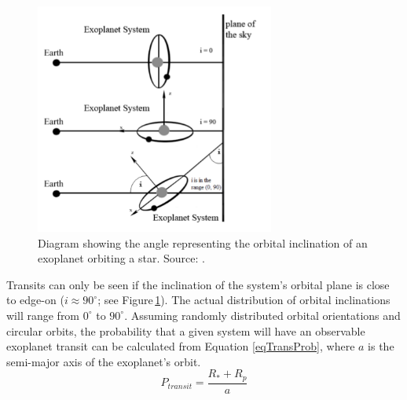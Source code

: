 \begin{figure}
\centering
\includegraphics[width=0.7\textwidth]{OrbitalPlane.png}
\caption{Diagram showing the angle representing the orbital inclination of an exoplanet orbiting a star. Source: \citet{1998Zeilik}.}
\label{figOrbit}
\end{figure}

Transits can only be seen if the inclination of the system's orbital plane is close to edge-on ($i \approx 90^\circ$; see Figure\,\ref{figOrbit}). The actual distribution of orbital inclinations will range from $0^\circ$ to $90^\circ$. Assuming randomly distributed orbital orientations and circular orbits, the probability that a given system will have an observable exoplanet transit can be calculated from Equation \ref{eqTransProb}, where $a$ is the semi-major axis of the exoplanet's orbit.\\

\begin{equation}
P_{transit} = \frac{R_\ast + R_p}{a}
\label{eqTransProb}
\end{equation}

